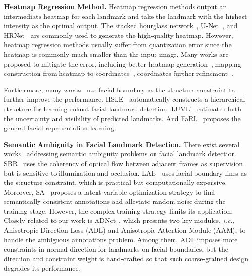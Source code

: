 \documentclass[10pt,twocolumn,letterpaper]{article}
\begin{document}
\noindent\textbf{Heatmap Regression Method.}
Heatmap regression methods output an intermediate heatmap for each landmark and take the landmark with the highest intensity as the optimal output. 
The stacked hourglass network~\cite{yang2017hgfacial}, U-Net~\cite{dapogny2019decafa}, and HRNet~\cite{hrnet} are commonly used to generate the high-quality heatmap.
However, heatmap regression methods usually suffer from quantization error since the heatmap is commonly much smaller than the input image.
Many works are proposed to mitigate the error, including better heatmap generation~\cite{dong2018sbr, bulat2021subpixel}, mapping construction from heatmap to coordinates~\cite{nibali2018numerical, kumar2020luvli}, coordinates further refinement~\cite{tai2019fhr, bulat2021subpixel, lan2021hih}.

Furthermore, many works~\cite{wu2018lab,wang2019awing,huang2021adnet} use facial boundary as the structure constraint to further improve the performance. HSLE~\cite{xu2019hsle} automatically constructs a hierarchical structure for learning robust facial landmark detection. LUVLi~\cite{kumar2020luvli} estimates both the uncertainty and visibility of predicted landmarks. And FaRL~\cite{zheng2021farl} proposes the general facial representation learning.

\noindent\textbf{Semantic Ambiguity in Facial Landmark Detection.}
There exist several works~\cite{wu2018lab, liu2019semantic, dong2018sbr, dong2020supervision, kumar2020luvli, huang2021adnet} addressing semantic ambiguity problems on facial landmark detection.
SBR~\cite{dong2018sbr} uses the coherency of optical flow between adjacent frames as supervision but is sensitive to illumination and occlusion.
LAB~\cite{wu2018lab} uses facial boundary lines as the structure constraint, which is practical but computationally expensive.
Moreover, SA~\cite{liu2019semantic} proposes a latent variable optimization strategy to find semantically consistent annotations and alleviate random noise during the training stage. However, the complex training strategy limits its application.
Closely related to our work is ADNet~\cite{huang2021adnet}, which presents two key modules, \emph{i.e.,} Anisotropic Direction Loss (ADL) and Anisotropic Attention Module (AAM), to handle the ambiguous annotations problem. Among them, ADL imposes more constraints in normal direction for landmarks on facial boundaries, but the direction and constraint weight is hand-crafted so that such coarse-grained design degrades its performance.
\end{document}
